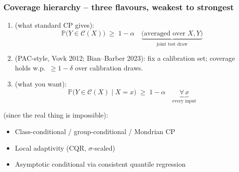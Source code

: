 \documentclass[11pt, aspectratio=169, xcolor={dvipsnames}, usepdftitle=false]{beamer}
\begin{document}
\begin{frame}
\frametitle{Coverage hierarchy -- three flavours, weakest to strongest}
\begin{enumerate}
\item {} (what standard CP gives):
\begin{equation*}
\mathbb{P}\bigl(Y \in \mathcal{C}(X)\bigr) \;\geq\; 1 - \alpha
\quad
\underbrace{\text{(averaged over } X, Y)}_{\text{joint test draw}}
\end{equation*}
\item {} (PAC-style, Vovk 2012; Bian--Barber 2023): fix a calibration set; coverage holds w.p.\ $\geq 1 - \delta$ over calibration draws.
\item {} (what you want):
\begin{equation*}
\mathbb{P}\bigl(Y \in \mathcal{C}(X) \mid X = x\bigr) \;\geq\; 1 - \alpha
\quad
\underbrace{\forall\, x}_{\text{every input}}
\end{equation*}
\end{enumerate}
 (since the real thing is impossible):
\begin{itemize}
\item Class-conditional / group-conditional / Mondrian CP
\item Local adaptivity (CQR, $\sigma$-scaled)
\item Asymptotic conditional via consistent quantile regression
\end{itemize}
\end{frame}
\end{document}
